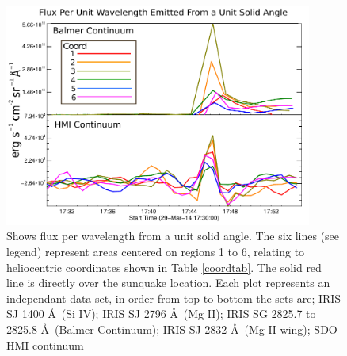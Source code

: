 \begin{figure}[H]
  \begin{center}
  \includegraphics[width=0.9\textwidth]{29-Mar-14-Flux-Ladder-Balm-HMI-Only}
  \end{center}
  \caption{Shows flux per wavelength from a unit solid angle. The six lines (see legend) represent areas centered on regions 1 to 6, relating to heliocentric coordinates shown in Table \ref{coordtab}. The solid red line is directly over the sunquake location. Each plot represents an independant data set, in order from top to bottom the sets are; IRIS SJ 1400 \AA\ (Si IV); IRIS SJ 2796 \AA\ (Mg II); IRIS SG  2825.7 to 2825.8 \AA\ (Balmer Continuum); IRIS SJ 2832 \AA\ (Mg II wing); SDO HMI continuum}\label{fluxladder-balm-hmi-only}
\end{figure}




